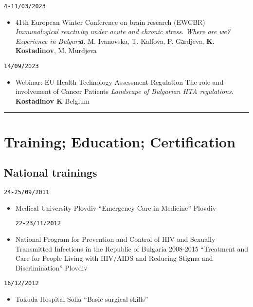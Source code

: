 \documentclass[
  12pt,
  letterpaper,
  DIV=11,
  numbers=noendperiod]{scrartcl}
\providecommand{\tightlist}{%
  \setlength{\itemsep}{0pt}\setlength{\parskip}{0pt}}\usepackage{longtable,booktabs,array}
\begin{document}
\texttt{4-11/03/2023}

\begin{itemize}
\tightlist
\item
  41th European Winter Conference on brain research (EWCBR) \textbar{}
  \emph{Immunological reactivity under acute and chronic stress. Where
  are we? Experience in Bulgariа.} \textbar{} M. Ivanovska, T. Kalfova,
  P. Gаrdjeva, \textbf{K. Kostadinov}, M. Murdjeva
\end{itemize}

\texttt{14/09/2023}

\begin{itemize}
\tightlist
\item
  Webinar: EU Health Technology Assessment Regulation \textbar{} The
  role and involvement of Cancer Patients \textbar{} \emph{Landscape of
  Bulgarian HTA regulations}. \textbar{} \textbf{Kostadinov K}
  \textbar{} Belgium
\end{itemize}

\begin{center}\rule{0.5\linewidth}{0.5pt}\end{center}

\section{Training; Education;
Certification}\label{training-education-certification}

\subsection{National trainings}\label{national-trainings}

\texttt{24-25/09/2011}

\begin{itemize}
\item
  Medical University Plovdiv \textbar{} ``Emergency Care in Medicine''
  \textbar{} Plovdiv

  \texttt{22-23/11/2012}
\item
  National Program for Prevention and Control of HIV and Sexually
  Transmitted Infections in the Republic of Bulgaria 2008-2015
  \textbar{} ``Treatment and Care for People Living with HIV/AIDS and
  Reducing Stigma and Discrimination'' \textbar{} Plovdiv
\end{itemize}

\texttt{16/12/2012}

\begin{itemize}
\tightlist
\item
  Tokuda Hospital Sofia \textbar{} ``Basic surgical skills''
\end{itemize}
\end{document}
